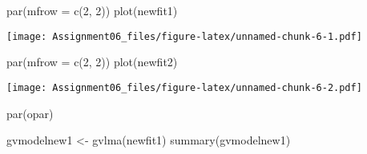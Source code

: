 \documentclass[
]{article}
\newenvironment{Shaded}{\begin{snugshade}}{\end{snugshade}}
\newcommand{\AttributeTok}[1]{\textcolor[rgb]{0.77,0.63,0.00}{#1}}
\newcommand{\DecValTok}[1]{\textcolor[rgb]{0.00,0.00,0.81}{#1}}
\newcommand{\FunctionTok}[1]{\textcolor[rgb]{0.00,0.00,0.00}{#1}}
\newcommand{\NormalTok}[1]{#1}
\newcommand{\OtherTok}[1]{\textcolor[rgb]{0.56,0.35,0.01}{#1}}
\begin{document}
\begin{Shaded}
\begin{Highlighting}[]
\FunctionTok{par}\NormalTok{(}\AttributeTok{mfrow =} \FunctionTok{c}\NormalTok{(}\DecValTok{2}\NormalTok{, }\DecValTok{2}\NormalTok{))}
\FunctionTok{plot}\NormalTok{(newfit1)}
\end{Highlighting}
\end{Shaded}

\texttt{[image: Assignment06\_files/figure-latex/unnamed-chunk-6-1.pdf]}

\begin{Shaded}
\begin{Highlighting}[]
\FunctionTok{par}\NormalTok{(}\AttributeTok{mfrow =} \FunctionTok{c}\NormalTok{(}\DecValTok{2}\NormalTok{, }\DecValTok{2}\NormalTok{))}
\FunctionTok{plot}\NormalTok{(newfit2)}
\end{Highlighting}
\end{Shaded}

\texttt{[image: Assignment06\_files/figure-latex/unnamed-chunk-6-2.pdf]}

\begin{Shaded}
\begin{Highlighting}[]
\FunctionTok{par}\NormalTok{(opar)}

\NormalTok{gvmodelnew1 }\OtherTok{\textless{}{-}} \FunctionTok{gvlma}\NormalTok{(newfit1)}
\FunctionTok{summary}\NormalTok{(gvmodelnew1)}
\end{Highlighting}
\end{Shaded}
\end{document}
